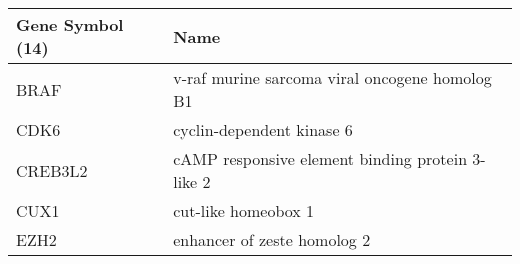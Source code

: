 \begin{tabular}{ll}
\toprule
Gene Symbol (14) &                                             Name \\
\midrule
            BRAF &   v-raf murine sarcoma viral oncogene homolog B1 \\
            CDK6 &                        cyclin-dependent kinase 6 \\
         CREB3L2 & cAMP responsive element binding protein 3-like 2 \\
            CUX1 &                              cut-like homeobox 1 \\
            EZH2 &                      enhancer of zeste homolog 2 \\
\bottomrule
\end{tabular}
